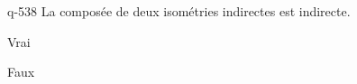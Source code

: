 \begin{truefalse}{q-538}
La composée de deux isométries indirectes est indirecte.
\item Vrai
\item* Faux
\end{truefalse}

